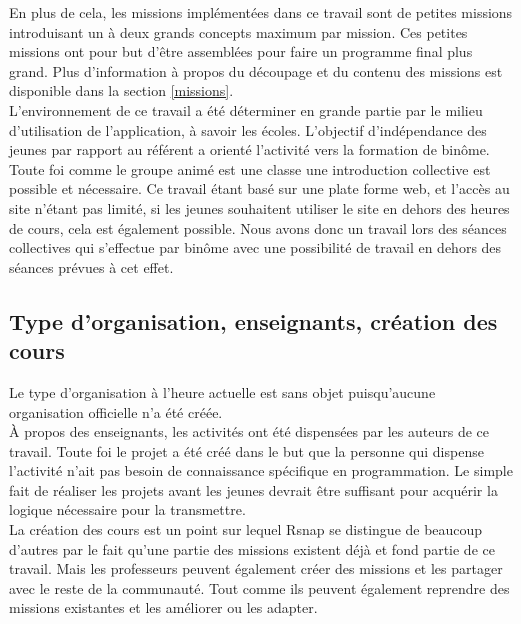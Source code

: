 En plus de cela, les missions implémentées dans ce travail sont de petites missions introduisant un à deux grands concepts maximum par mission. Ces petites missions ont pour but d'être assemblées pour faire un programme final plus grand. Plus d'information à propos du découpage et du contenu des missions est disponible dans la section \ref{missions}.\\

L'environnement de ce travail a été déterminer en grande partie par le milieu d'utilisation de l'application, à savoir les écoles. L'objectif d'indépendance des jeunes par rapport au référent a orienté l'activité vers la formation de binôme. Toute foi comme le groupe animé est une classe une introduction collective est possible et nécessaire. Ce travail étant basé sur une plate forme web, et l'accès au site n'étant pas limité, si les jeunes souhaitent utiliser le site en dehors des heures de cours, cela est également possible.
Nous avons donc un travail lors des séances collectives qui s'effectue par binôme avec une possibilité de travail en dehors des séances prévues à cet effet.

\subsection{Type d'organisation, enseignants, création des cours}
Le type d'organisation à l'heure actuelle est sans objet puisqu'aucune organisation officielle n'a été créée.\\

À propos des enseignants, les activités ont été dispensées par les auteurs de ce travail. Toute foi le projet a été créé dans le but que la personne qui dispense l'activité n'ait pas besoin de connaissance spécifique en programmation. Le simple fait de réaliser les projets avant les jeunes devrait être suffisant pour acquérir la logique nécessaire pour la transmettre.\\

La création des cours est un point sur lequel Rsnap se distingue de beaucoup d'autres par le fait qu'une partie des missions existent déjà et fond partie de ce travail. Mais les professeurs peuvent également créer des missions et les partager avec le reste de la communauté. Tout comme ils peuvent également reprendre des missions existantes et les améliorer ou les adapter. %

